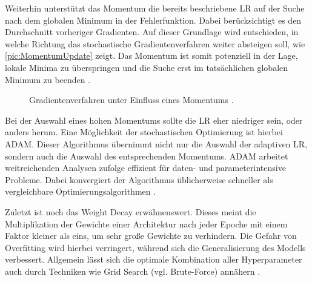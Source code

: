 \noindent
Weiterhin unterstützt das Momentum die bereits beschriebene \ac{LR} auf der Suche nach dem globalen Minimum in der Fehlerfunktion. Dabei berücksichtigt es den Durchschnitt vorheriger Gradienten. Auf dieser Grundlage wird entschieden, in welche Richtung das stochastische Gradientenverfahren weiter absteigen soll, wie \autoref{pic:MomentumUpdate} zeigt. Das Momentum ist somit potenziell in der Lage, lokale Minima zu überspringen und die Suche erst im tatsächlichen globalen Minimum zu beenden \cite[S.~292-295]{GOO16}.\\

\begin{figure}[h!]
  \centering
  \caption{Gradientenverfahren unter Einfluss eines Momentums \cite{CSNOJ}.}
  \label{pic:MomentumUpdate}
\end{figure}

\noindent
Bei der Auswahl eines hohen Momentums sollte die \ac{LR} eher niedriger sein, oder anders herum. Eine Möglichkeit der stochastischen Optimierung ist hierbei \ac{ADAM}. Dieser Algorithmus übernimmt nicht nur die Auswahl der adaptiven \ac{LR}, sondern auch die Auswahl des entsprechenden Momentums. \ac{ADAM} arbeitet weitreichenden Analysen zufolge effizient für daten- und parameterintensive Probleme. Dabei konvergiert der Algorithmus üblicherweise schneller als vergleichbare Optimierungsalgorithmen \cite[S.~1-2]{KIN17}.
\newpage

\noindent
Zuletzt ist noch das Weight Decay erwähnenswert. Dieses meint die Multiplikation der Gewichte einer Architektur nach jeder Epoche mit einem Faktor kleiner als eins, um sehr große Gewichte zu verhindern. Die Gefahr von Overfitting wird hierbei verringert, während sich die Generalisierung des Modells verbessert. Allgemein lässt sich die optimale Kombination aller Hyperparameter auch durch Techniken wie Grid Search (vgl. Brute-Force) annähern \cite[S.~24]{YAN20}.


